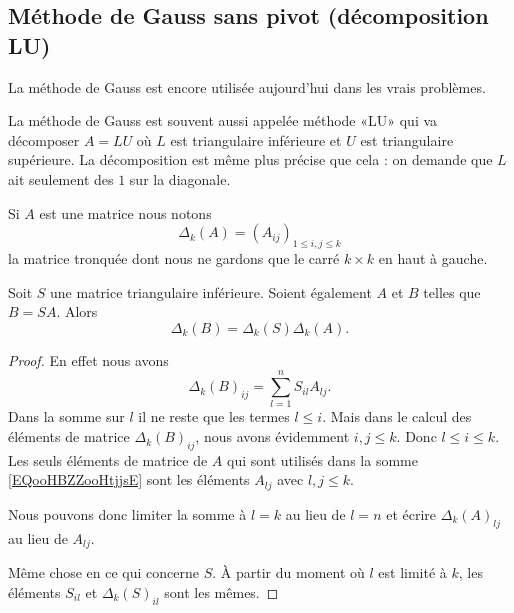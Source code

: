 \subsection{Méthode de Gauss sans pivot (décomposition LU)}

La méthode de Gauss est encore utilisée aujourd'hui dans les vrais problèmes.

La méthode de Gauss est souvent aussi appelée méthode «LU» qui va décomposer \( A=LU\) où \( L\) est triangulaire inférieure et \( U\) est triangulaire supérieure. La décomposition est même plus précise que cela : on demande que \( L\) ait seulement des \( 1\) sur la diagonale.

Si \( A\) est une matrice nous notons
\begin{equation}
	\Delta_k(A)= (A_{ij})_{1\leq i,j\leq k}
\end{equation}
la matrice tronquée dont nous ne gardons que le carré \( k\times k\) en haut à gauche.

\begin{lemma}       \label{LEMooXEJFooGiYoyb}
	Soit \( S\) une matrice triangulaire inférieure. Soient également \( A\) et \( B\) telles que \( B=SA\). Alors
	\begin{equation}
		\Delta_k(B)=\Delta_k(S)\Delta_k(A).
	\end{equation}
\end{lemma}

\begin{proof}
	En effet nous avons
	\begin{equation}       \label{EQooHBZZooHtjjsE}
		\Delta_k(B)_{ij}=\sum_{l=1}^nS_{il}A_{lj}.
	\end{equation}
	Dans la somme sur \( l\) il ne reste que les termes \( l\leq i\). Mais dans le calcul des éléments de matrice \( \Delta_k(B)_{ij}\), nous avons évidemment \( i,j\leq k\). Donc \( l\leq i\leq k\). Les seuls éléments de matrice de \( A\) qui sont utilisés dans la somme \eqref{EQooHBZZooHtjjsE} sont les éléments \( A_{lj}\) avec \( l,j\leq k\).

	Nous pouvons donc limiter la somme à \( l=k\) au lieu de \( l=n\) et écrire \( \Delta_k(A)_{lj}\) au lieu de \( A_{lj}\).

	Même chose en ce qui concerne \( S\). À partir du moment où \( l\) est limité à \( k\), les éléments \( S_{il}\) et \( \Delta_k(S)_{il}\) sont les mêmes.
\end{proof}

